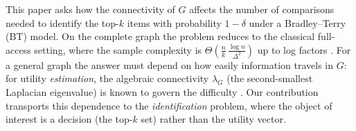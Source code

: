 \documentclass[11pt]{article}
\theoremstyle{definition}
\newcommand{\lG}{\lambda_G}
\begin{document}
This paper asks how the connectivity of $G$ affects the number of comparisons needed to identify the top-$k$ items with probability $1-\delta$ under a Bradley--Terry (BT) model.  On the complete graph the problem reduces to the classical full-access setting, where the sample complexity is $\Theta\!\left(\frac{n}{k}\,\frac{\log n}{\Delta^2}\right)$ up to log factors \cite{shah2015simple,heckel2018approximate,chen2017spectral,goldberger2026optimal}.  For a general graph the answer must depend on how easily information travels in $G$: for utility \emph{estimation}, the algebraic connectivity $\lG$ (the second-smallest Laplacian eigenvalue) is known to govern the difficulty \cite{shah2015estimation,li2021ellinftybounds,yang2026graphmonotone,han2026bradleyterry}.  Our contribution transports this dependence to the \emph{identification} problem, where the object of interest is a decision (the top-$k$ set) rather than the utility vector.
\end{document}
